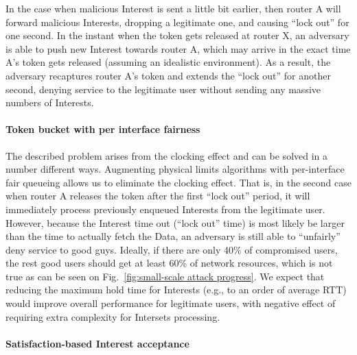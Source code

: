 In the case when malicious Interest is sent a little bit earlier, then router A will forward malicious Interests, dropping a legitimate one, and causing ``lock out'' for one second.
In the instant when the token gets released at router X, an adversary is able to push new Interest towards router A, which may arrive in the exact time A's token gets released (assuming an idealistic environment).
As a result, the adversary recaptures router A's token and extends the ``lock out'' for another second, denying service to the legitimate user without sending any massive numbers of Interests.

\paragraph{\textbf{Token bucket with per interface fairness}}

The described problem arises from the clocking effect and can be solved in a number different ways.
Augmenting physical limits algorithms with per-interface fair queueing allows us to eliminate the clocking effect. 
That is, in the second case when router A releases the token after the first ``lock out'' period, it will immediately process previously enqueued Interests from the legitimate user.
However, because the Interest time out (``lock out'' time) is most likely be larger than the time to actually fetch the Data, an adversary is still able to ``unfairly'' deny service to good guys.
Ideally, if there are only 40\% of compromised users, the rest good users should get at least 60\% of network resources, which is not true as can be seen on Fig.~\ref{fig:small-scale attack progress}.
We expect that reducing the maximum hold time for Interests (e.g., to an order of average RTT) would improve overall performance for legitimate users, with negative effect of requiring extra complexity for Intersets processing.

\paragraph{\textbf{Satisfaction-based Interest acceptance}}

